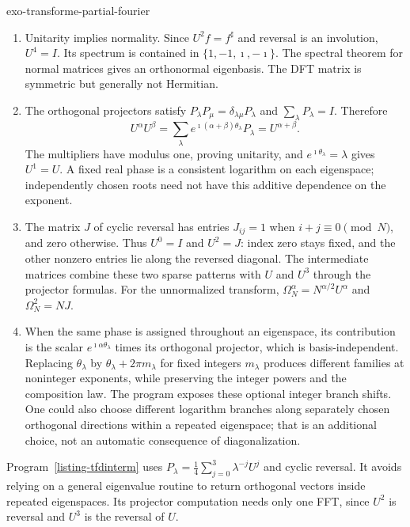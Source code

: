 \begin{correction}{exo-transforme-partial-fourier}
\begin{enumerate}
\item Unitarity implies normality. Since $U^2f=f^\sharp$ and reversal is an
involution, $U^4=I$. Its spectrum is contained in $\{1,-1,\imath,-\imath\}$.
The spectral theorem for normal matrices gives an orthonormal eigenbasis.
The DFT matrix is symmetric but generally not Hermitian.
\item The orthogonal projectors satisfy
$P_\lambda P_\mu=\delta_{\lambda\mu}P_\lambda$ and $\sum_\lambda P_\lambda=I$.
Therefore
\[
 U^\alpha U^\beta=\sum_\lambda
 e^{\imath(\alpha+\beta)\theta_\lambda}P_\lambda=U^{\alpha+\beta}.
\]
The multipliers have modulus one, proving unitarity, and
$e^{\imath\theta_\lambda}=\lambda$ gives $U^1=U$.
A fixed real phase is a consistent logarithm on each eigenspace;
independently chosen roots need not have this additive dependence on the exponent.
\item The matrix $J$ of cyclic reversal has entries
$J_{ij}=1$ when $i+j\equiv0\pmod N$, and zero otherwise.
Thus $U^0=I$ and $U^2=J$: index zero stays fixed, and the other nonzero
entries lie along the reversed diagonal. The intermediate matrices combine
these two sparse patterns with $U$ and $U^3$ through the projector formulas.
For the unnormalized transform,
$\Omega_N^\alpha=N^{\alpha/2}U^\alpha$ and $\Omega_N^2=NJ$.
\item When the same phase is assigned throughout an eigenspace, its
contribution is the scalar $e^{\imath\alpha\theta_\lambda}$ times its
orthogonal projector, which is basis-independent.
Replacing $\theta_\lambda$ by $\theta_\lambda+2\pi m_\lambda$ for fixed
integers $m_\lambda$ produces different families at noninteger exponents,
while preserving the integer powers and the composition law.
The program exposes these optional integer branch shifts.
One could also choose different logarithm branches along separately chosen
orthogonal directions within a repeated eigenspace; that is an additional
choice, not an automatic consequence of diagonalization.
\end{enumerate}
Program~\ref{listing-tfdinterm} uses
$P_\lambda=\frac14\sum_{j=0}^3\lambda^{-j}U^j$ and cyclic reversal.
It avoids relying on a general eigenvalue routine to return orthogonal vectors
inside repeated eigenspaces. Its projector computation needs only one FFT,
since $U^2$ is reversal and $U^3$ is the reversal of $U$.
\begin{listing}[H]
\caption{Unitary intermediate DFTs from explicit spectral projectors.}
\label{listing-tfdinterm}
\end{listing}
\end{correction}

